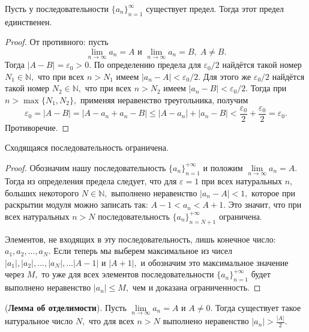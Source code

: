 \begin{proposition}
    Пусть у последовательности $\{a_n\}_{n=1}^{\infty}$
    существует предел. Тогда этот предел единственен.
\end{proposition}
\begin{proof}
    От противного: пусть
    $$
        \lim\limits_{n\rightarrow\infty}a_n=A
        \textrm{ и }
        \lim\limits_{n\rightarrow\infty}a_n=B,\;A\neq B.
    $$
    Тогда $|A-B|=\varepsilon_0>0.$ По определению
    предела для  $\varepsilon_0/2$ найдётся
    такой номер $N_1\in\mathbb{N},$
    что при всех $n>N_1$
    имеем $|a_n-A|<\varepsilon_0/2.$
    Для этого же $\varepsilon_0/2$
    найдётся
    такой номер $N_2\in\mathbb{N},$
    что при всех $n>N_2$
    имеем $|a_n-B|<\varepsilon_0/2.$ Тогда
    при $n>\max\{N_1, N_2\},$ применяя
    неравенство треугольника, получим
    $$
        \varepsilon_0=|A-B|=
        |A-a_n+a_n-B|\leq|A-a_n|+|a_n-B|<
        \frac{\varepsilon_0}{2}+\frac{\varepsilon_0}{2}=
        \varepsilon_0.
    $$
    Противоречие.
\end{proof}

\begin{proposition}
    Сходящаяся последовательность ограничена.
\end{proposition}
\begin{proof}
    Обозначим нашу последовательность
    $\{a_n\}_{n=1}^{+\infty}$
    и положим
    $\lim\limits_{n\rightarrow\infty}a_n=A.$
    Тогда из определения предела следует,
    что для $\varepsilon=1$ при всех натуральных
    $n,$ больших некоторого $N\in\mathbb{N},$
    выполнено неравенство $|a_n-A|<1,$
    которое при раскрытии модуля можно
    записать так: $A-1<a_n<A+1.$
    Это значит, что при всех натуральных
    $n>N$ последовательность
    $\{a_n\}_{n=N+1}^{+\infty}$
    ограничена.

    Элементов,
    не входящих в эту последовательность,
    лишь конечное число: $a_1, a_2, ..., a_{N}.$
    Если теперь мы выберем максимальное из
    чисел $|a_1|, |a_2|, ..., |a_{N}|, ... |A-1|$
    и $|A+1|,$
    и обозначим это максимальное значение
    через $M,$ то уже для всех элементов
    последовательности $\{a_n\}_{n=1}^{+\infty}$
    будет выполнено неравенство $|a_n|\leq M,$
    чем и доказана ограниченность.
\end{proof}

\begin{proposition}
    (\textbf{Лемма об отделимости}).
    Пусть $\lim\limits_{n\rightarrow\infty}a_n=A$
    и $A\neq0.$ Тогда существует такое
    натуральное число $N,$ что для всех
    $n>N$ выполнено неравенство
    $|a_n|>\frac{|A|}{2}.$
\end{proposition}

